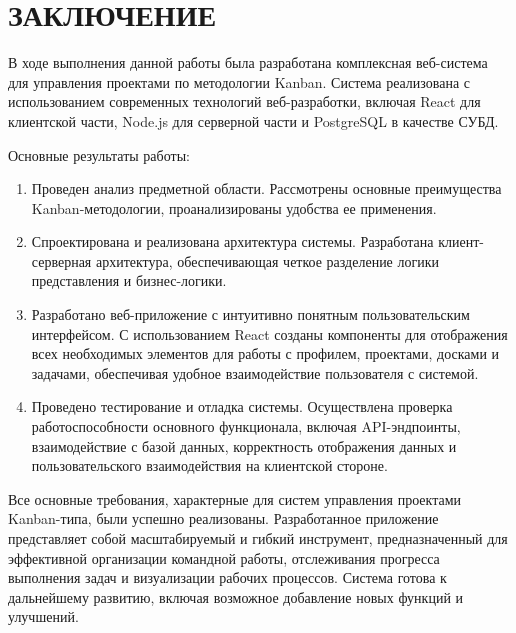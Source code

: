 \section*{ЗАКЛЮЧЕНИЕ}

В ходе выполнения данной работы была разработана комплексная веб-система для управления проектами по методологии Kanban. Система реализована с использованием современных технологий веб-разработки, включая React для клиентской части, Node.js для серверной части и PostgreSQL в качестве СУБД.

Основные результаты работы:
\begin{enumerate}
\item Проведен анализ предметной области. Рассмотрены основные преимущества Kanban-методологии, проанализированы удобства ее применения.
\item Спроектирована и реализована архитектура системы. Разработана клиент-серверная архитектура, обеспечивающая четкое разделение логики представления и бизнес-логики.
\item Разработано веб-приложение с интуитивно понятным пользовательским интерфейсом. С использованием React созданы компоненты для отображения всех необходимых элементов для работы с профилем, проектами, досками и задачами, обеспечивая удобное взаимодействие пользователя с системой.
\item Проведено тестирование и отладка системы. Осуществлена проверка работоспособности основного функционала, включая API-эндпоинты, взаимодействие с базой данных, корректность отображения данных и пользовательского взаимодействия на клиентской стороне.
\end{enumerate}

Все основные требования, характерные для систем управления проектами Kanban-типа, были успешно реализованы. Разработанное приложение представляет собой масштабируемый и гибкий инструмент, предназначенный для эффективной организации командной работы, отслеживания прогресса выполнения задач и визуализации рабочих процессов. Система готова к дальнейшему развитию, включая возможное добавление новых функций и улучшений.

